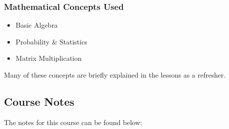 {\begin{highlight}[\CSPBCogSci]
        \subsubsection*{Mathematical Concepts Used}
        
        \begin{itemize}
            \item Basic Algebra
            \item Probability \& Statistics
            \item Matrix Multiplication
        \end{itemize}
        Many of these concepts are briefly explained in the lessons as a refresher.
    \end{highlight}
}

\subsection{Course Notes}

The notes for this course can be found below: 